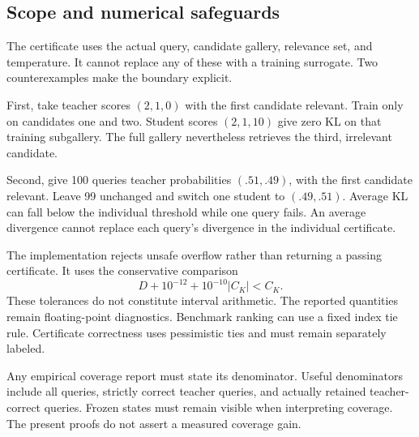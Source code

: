 \subsection{Scope and numerical safeguards}
The certificate uses the actual query, candidate gallery, relevance set, and temperature.
It cannot replace any of these with a training surrogate.
Two counterexamples make the boundary explicit.

First, take teacher scores $(2,1,0)$ with the first candidate relevant.
Train only on candidates one and two.
Student scores $(2,1,10)$ give zero KL on that training subgallery.
The full gallery nevertheless retrieves the third, irrelevant candidate.

Second, give 100 queries teacher probabilities $(.51,.49)$, with the first candidate relevant.
Leave 99 unchanged and switch one student to $(.49,.51)$.
Average KL can fall below the individual threshold while one query fails.
An average divergence cannot replace each query's divergence in the individual certificate.

The implementation rejects unsafe overflow rather than returning a passing certificate.
It uses the conservative comparison
\begin{equation}
D+10^{-12}+10^{-10}|C_K|<C_K.
\end{equation}
These tolerances do not constitute interval arithmetic.
The reported quantities remain floating-point diagnostics.
Benchmark ranking can use a fixed index tie rule.
Certificate correctness uses pessimistic ties and must remain separately labeled.

Any empirical coverage report must state its denominator.
Useful denominators include all queries, strictly correct teacher queries, and actually retained teacher-correct queries.
Frozen states must remain visible when interpreting coverage.
The present proofs do not assert a measured coverage gain.
